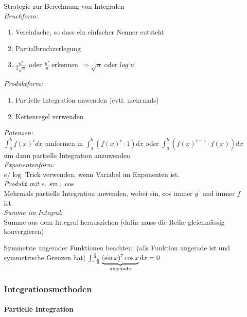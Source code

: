 \begin{KR}{Strategie zur Berechnung von Integralen}
    \\\emph{Bruchform:}
    \begin{enumerate}
        \item Vereinfache, so dass ein einfacher Nenner entsteht
        \item Partialbruchzerlegung
        \item $\frac{u'}{2\sqrt{u}}$ oder $\frac{u'}{u}$ erkennen $\Rightarrow \sqrt{u}$ oder $log|u|$
    \end{enumerate}
    \emph{Produktform:}
    \begin{enumerate}
        \item Partielle Integration anwenden (evtl. mehrmals)
        \item Kettenregel verwenden
    \end{enumerate}
    \emph{Potenzen:}\\
        $\int_{a}^{b} f(x)^{c} d x$ umformen in $\int_{a}^{b}(f(x)^{c} \cdot 1) d x$ oder $\int_{a}^{b}(f(x)^{c-1} \cdot f(x)) d x$ um dann partielle Integration anzuwenden\\
    \emph{Exponentenform:}\\
        $e / \log$ Trick verwenden, wenn Variabel im Exponenten ist.\\
    \emph{Produkt mit $e, \sin , \cos$}\\
        Mehrmals partielle Integration anwenden, wobei sin, cos immer $g^{\prime}$ und immer $f$ ist.\\
    \emph{Summe im Integral:}\\
        Summe aus dem Integral herausziehen (dafür muss die Reihe gleichmässig konvergieren)
\end{KR}

Symmetrie ungerader Funktionen beachten: (alls Funktion ungerade ist und symmetrische Grenzen hat)
$\int_{-\frac{\pi}{2}}^{\frac{\pi}{2}} \underbrace{(\sin x)^7 \cos x}_{\text{ungerade}} \dif x = 0$


\subsubsection{Integrationsmethoden}
\paragraph{Partielle Integration}


